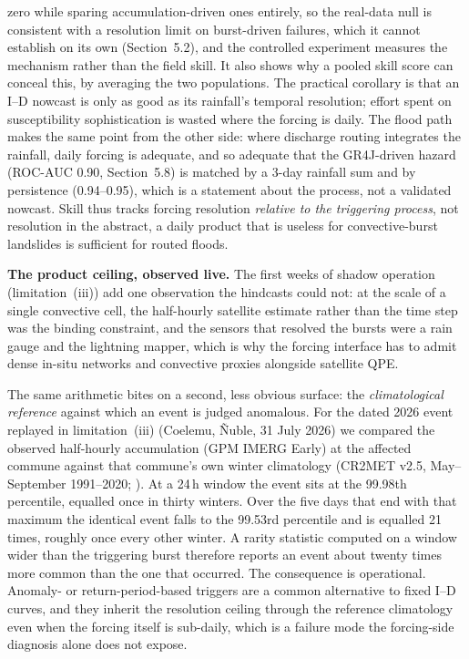 \documentclass[authoryear,preprint,review,12pt]{elsarticle}
\begin{document}
zero while sparing accumulation-driven ones entirely, so the real-data null is consistent with a resolution limit on burst-driven failures, which it cannot establish on its own (Section~5.2), and the controlled experiment measures the mechanism rather than the field skill. It also shows why a pooled skill score can conceal this, by averaging
the two populations. The practical corollary is that an I--D nowcast is only as good as its
rainfall's temporal resolution; effort spent on susceptibility sophistication is
wasted where the forcing is daily. The flood path makes the same point from the other side: where discharge routing integrates the rainfall, daily
forcing is adequate, and so adequate that the GR4J-driven hazard (ROC-AUC 0.90, Section~5.8) is matched by a
3-day rainfall sum and by persistence (0.94--0.95), which is a statement about the process, not a validated nowcast. Skill thus tracks forcing resolution \emph{relative to
the triggering process}, not resolution in the abstract, a daily product that is
useless for convective-burst landslides is sufficient for routed floods.

\textbf{The product ceiling, observed live.} The first weeks of shadow operation
(limitation~(iii)) add one observation the hindcasts could not: at the scale of a single
convective cell, the half-hourly satellite estimate rather than the time step was the
binding constraint, and the sensors that resolved the bursts were a rain gauge and
the lightning mapper, which is why the forcing interface has to admit dense in-situ
networks and convective proxies alongside satellite QPE.

The same arithmetic bites on a second, less obvious surface: the
\emph{climatological reference} against which an event is judged anomalous. For
the dated 2026 event replayed in limitation~(iii) (Coelemu, \~Nuble, 31 July 2026) we compared the observed half-hourly
accumulation (GPM IMERG Early) at the affected commune against that commune's own winter
climatology (CR2MET v2.5, May--September 1991--2020; \citealp{boisier2018cr2met}). At a 24\,h window the event sits
at the 99.98th percentile, equalled once in thirty winters. Over the five days
that end with that maximum the identical event falls to the 99.53rd percentile and
is equalled 21 times, roughly once every other winter. A rarity statistic computed
on a window wider than the triggering burst therefore reports an event about twenty
times more common than the one that occurred. The consequence is operational. Anomaly- or return-period-based triggers are a common alternative to fixed I--D curves, and they inherit the resolution ceiling through the reference climatology even when the
forcing itself is sub-daily, which is a failure mode the forcing-side diagnosis
alone does not expose.
\end{document}
